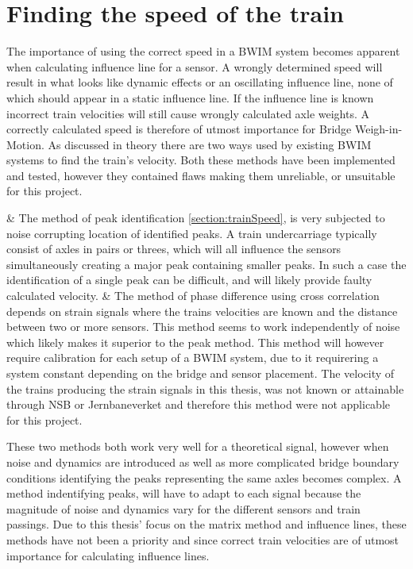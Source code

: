 \section{Finding the speed of the train}
The importance of using the correct speed in a BWIM system becomes apparent when calculating influence line for a sensor. A wrongly determined speed will result in what looks like dynamic effects or an oscillating influence line, none of which should appear in a static influence line. If the influence line is known incorrect train velocities will still cause wrongly calculated axle weights. A correctly calculated speed is therefore of utmost importance for Bridge Weigh-in-Motion.
As discussed in theory there are two ways used by existing BWIM systems to find the train's velocity. Both these methods have been implemented and tested, however they contained flaws making them unreliable, or unsuitable for this project.
\begin{easylist}[itemize]
 & The method of peak identification \ref{section:trainSpeed}, is very subjected to noise corrupting location of identified peaks. A train undercarriage typically consist of axles in pairs or threes, which will all influence the sensors simultaneously creating a major peak containing smaller peaks. In such a case the identification of a single peak can be difficult, and will likely provide faulty calculated velocity.
 & The method of phase difference using cross correlation depends on strain signals where the trains velocities are known and the distance between two or more sensors. This method seems to work independently of noise which likely makes it superior to the peak method. This method will however require calibration for each setup of a BWIM system, due to it requirering a system constant depending on the bridge and sensor placement. The velocity of the trains producing the strain signals in this thesis, was not known or attainable through NSB or Jernbaneverket and therefore this method were not applicable for this project.
\end{easylist}
These two methods both work very well for a theoretical signal, however when noise and dynamics are introduced as well as more complicated bridge boundary conditions identifying the peaks representing the same axles becomes complex. A method indentifying peaks, will have to adapt to each signal because the magnitude of noise and dynamics vary for the different sensors and train passings. Due to this thesis' focus on the matrix method and influence lines, these methods have not been a priority and since correct train velocities are of utmost importance for calculating influence lines.

